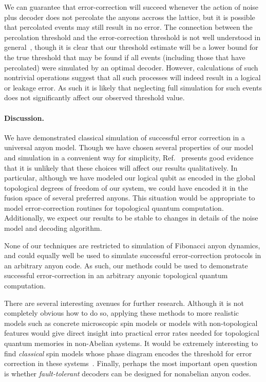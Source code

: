 \documentclass[aps, prl, letterpaper, twocolumn, superscriptaddress, notitlepage, 10pt]{revtex4-1}
\begin{document}
We can guarantee that error-correction will succeed whenever
the action of noise plus decoder 
does not percolate the anyons accross the lattice,
but it is possible that percolated events may still result in no error. 
The connection between the percolation threshold and the error-correction threshold 
is not well understood in general~\cite{Hastings2014}, though it is clear 
that our threshold estimate will be a lower bound for 
the true threshold that may be found if all events 
(including those that have percolated) were simulated by an optimal decoder. 
However, calculations of such nontrivial operations suggest that all such 
processes will indeed result in a logical or leakage error.
As such it is likely that neglecting full simulation for 
such events does not significantly affect our observed threshold value.

\paragraph{Discussion.}

We have demonstrated classical simulation of successful error correction in a universal anyon model. 
Though we have chosen several properties of our model and 
simulation in a convenient way for simplicity,
Ref.~\cite{Brell2013} presents good evidence that it is
unlikely that these choices will affect our results qualitatively.
In particular, although we have modeled our logical qubit as 
encoded in the global topological degrees of freedom of our 
system, we could have encoded it in the fusion space of several preferred anyons. 
This situation would be appropriate to model error-correction routines for topological quantum computation. 
Additionally, we expect our results to be stable to changes in details of the noise model and decoding algorithm.

None of our techniques are restricted to simulation of Fibonacci anyon dynamics, and could 
equally well be used to simulate successful error-correction protocols in an arbitrary anyon code. 
As such, our methods could be used to demonstrate successful 
error-correction in an arbitrary anyonic topological quantum computation.

There are several interesting avenues for further research. 
Although it is not completely obvious how to do so, 
applying these methods to more realistic models such as concrete 
microscopic spin models or models with non-topological features would give 
direct insight into practical error rates needed for topological quantum memories in non-Abelian systems. 
It would be extremely interesting to find \emph{classical} spin models 
whose phase diagram encodes the threshold for error correction in these systems~\cite{Dennis2002}.
Finally, perhaps the most important open question is whether 
\emph{fault-tolerant} decoders can be designed for nonabelian anyon codes. 
\end{document}
